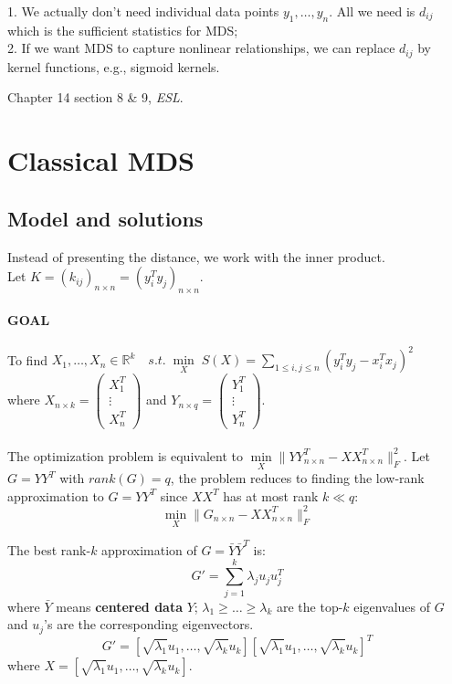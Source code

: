 \documentclass[12pt]{book}
\theoremstyle{definition}
\theoremstyle{remark}
\newcommand{\R}{\mathbb{R}}
\begin{document}
\begin{notionbox}[Note]
    1. We actually don't need individual data points $y_1,\dots,y_n$. All we need is $d_{ij}$ which is the sufficient statistics for MDS;\\
    2. If we want MDS to capture nonlinear relationships, we can replace $d_{ij}$ by kernel functions, e.g., sigmoid kernels.
\end{notionbox}


\begin{referencebox}
    Chapter 14 section 8 \& 9, \textit{ESL}.
\end{referencebox}

\newpage
\section{Classical MDS}
\subsection{Model and solutions}
Instead of presenting the distance, we work with the inner product.\\
Let $K = (k_{ij})_{n\times n} = (y_i^Ty_j)_{n\times n}$.\\
\paragraph{GOAL} To find $X_1, \dots, X_n \in \R^k\quad s.t. \;\underset{X}{\min}\;S(X) = \sum_{1\le i,j\le n}(y_i^Ty_j - x_i^Tx_j)^2$\\
where $X_{n\times k} = \begin{pmatrix}X_1^T
 \\\vdots
 \\X_n^T\end{pmatrix}$ 
 and $Y_{n\times q} = \begin{pmatrix}Y_1^T
 \\\vdots
 \\Y_n^T
\end{pmatrix}$.\\
\\

The optimization problem is equivalent to $\underset{X}{\min}\|YY^T_{n\times n} - XX^T_{n\times n}\|_F^2$.
Let $G = YY^T$ with $rank(G) = q$, the problem reduces to finding the low-rank approximation to $G = YY^T$ since $XX^T$ has at most rank $k \ll q$:
\[\underset{X}{\min}\|G_{n\times n} - XX^T_{n\times n}\|_F^2\]

\begin{notionbox}
    The best rank-$k$ approximation of $G = \bar{Y}\bar{Y}^T$ is: \[G' = \sum_{j=1}^k \lambda_j u_ju_j^T\]
    where $\bar{Y}$ means \textbf{centered data} $Y$; $\lambda_1\ge \dots \ge \lambda_k$ are the top-$k$ eigenvalues of $G$ and $u_j$'s are the corresponding eigenvectors.\\
    \[G' = [\sqrt{\lambda_1}u_1, \dots,\sqrt{\lambda_k}u_k][\sqrt{\lambda_1}u_1, \dots,\sqrt{\lambda_k}u_k]^T\]
    where $X = [\sqrt{\lambda_1}u_1, \dots,\sqrt{\lambda_k}u_k]$.
\end{notionbox}
\end{document}
